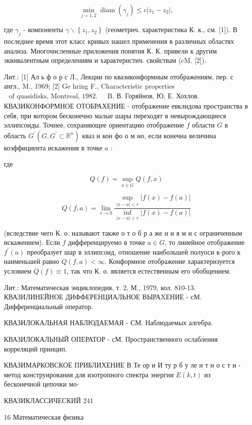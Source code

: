\documentclass[10pt]{article}
\begin{document}
\[

\min _{j=1,2} \operatorname{diam}\left(\gamma_{j}\right) \leqslant c\left|z_{1}-z_{2}\right|,

\]



где $\gamma_{j}$ - компоненты $\gamma \backslash\left\{z_{1}, z_{2}\right\}$ (геометрич. характеристика К. к., см. [1]). В последнее время этот класс кривых нашел применения в различных областях анализа. Многочисленные приложения понятия К. К. привели к другим эквивалентным определениям и характеристич. свойствам (cM. [2]).



Лит.: [1] Ал ь ф о р с Л., Лекции по квазиконформным отображениям, пер. с англ., M., 1969; [2] Ge hring F., Characteristic properties $\begin{array}{ll}\text { of quasidisks, Montreal, 1982. } & \text { B. В. Горяйнов, Ю. Е. Хохлов. }\end{array}$ КВАЗИКОНФОРМНОЕ ОТОБРАХЕНИЕ - отображение евклидова пространства в себя, при котором бесконечно малые шары переходят в невырождающиеся эллипсоиды. Точнее, сохраняющее ориентацию отображение $f$ области $G$ в область $G^{\prime}\left(G, G^{\prime} \subset \mathbb{R}^{n}\right)$ кваз и кон фо о м но, если конечна величина коэффициента искажения в точке $a$ :



где



\[

Q(f)=\sup _{x \in G} Q(f, x)

\]



\[

Q(f, a)=\lim _{r \rightarrow 0} \frac{\sup _{|x-a|<r}|f(x)-f(a)|}{\inf _{|x-a|<r}|f(x)-f(a)|}

\]



(вследствие чего К. о. называют также о т о б р а же н и я м и с ограниченным искажением). Если $f$ дифференцируемо в точке $a \in G$, то линейное отображение $f^{\prime}(a)$ преобразует шар в эллипсоид, отношение наибольшей полуоси к-рого к наименьшей равно $Q(f, a)<\infty$. Конформное отображение характеризуется условием $Q(f) \equiv 1$, так что К. о. является естественным его обобщением.



Лит.: Математическая энциклопедия, т. 2, М., 1979, кол. 810-13. КВАЗИЛИНЕЙНОЕ ДИФФЕРЕНЦИАЛЬНОЕ ВЫРАXЕНИЕ - сМ. Дифференциальный оператор.



КВАЗИЛОКАЛЬНАЯ НАБЛЮДАЕМАЯ - СМ. Наблюдаемых алгебра.



КВАЗИЛОКАЛЬНЫЙ ОПЕРАТОР - сМ. Пространственного ослабления корреляций принцип.



КВАЗИМАРКОВСКОЕ ПРИБЛИХЕНИЕ В Те ор и И ту р б у ле н т н о с т и - метод конструирования для изотропного спектра энергии $E(k, t)$ из бесконечной цепочки мо-



КВАЗИКЛАССИЧЕСКИЙ 241



16 Математическая физика
\end{document}
